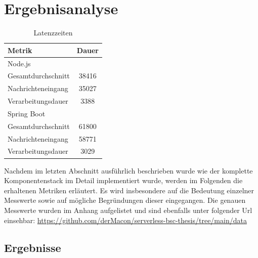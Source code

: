 \chapter{Ergebnisanalyse}



\begin{table}
  \vspace{-8mm}
  \centering
  \label{tab:latency}
  \hspace{1cm}
  \begin{tabular}{@{}lc@{}}
    \toprule
    Metrik & Dauer \\
    \midrule
    Node.js \\
    \hspace{3mm}Gesamtdurchschnitt & 38416 \\
    \hspace{3mm}Nachrichteneingang & 35027 \\
    \hspace{3mm}Verarbeitungsdauer & 3388 \\
    \midrule
    Spring Boot \\
    \hspace{3mm}Gesamtdurchschnitt & 61800 \\
    \hspace{3mm}Nachrichteneingang & 58771 \\
    \hspace{3mm}Verarbeitungsdauer & 3029 \\
    \bottomrule
  \end{tabular}
  \caption[Latenzzeit - Vergleich]{Latenzzeiten}
\end{table} 


Nachdem im letzten Abschnitt ausführlich beschrieben wurde wie der komplette Komponentenstack im Detail implementiert wurde, werden im Folgenden die erhaltenen Metriken erläutert. Es wird insbesondere auf die Bedeutung einzelner Messwerte sowie auf mögliche Begründungen dieser eingegangen. Die genauen Messwerte wurden im Anhang aufgelistet und sind ebenfalls unter folgender Url einsehbar: \url{https://github.com/derMacon/serverless-bsc-thesis/tree/main/data} 


\section{Ergebnisse}

